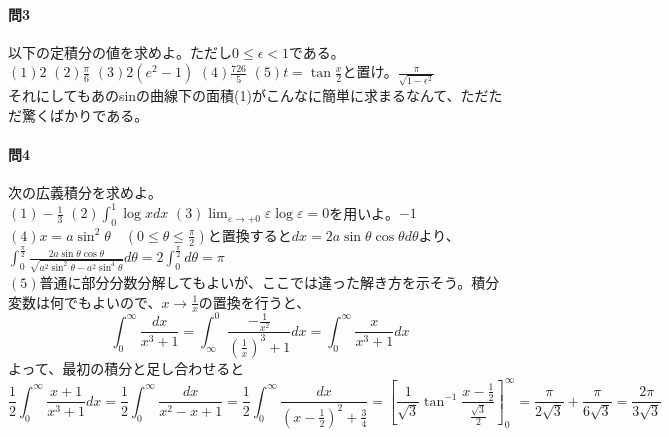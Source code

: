 \documentclass[a4j,dvipdfmx]{jsarticle}
\begin{document}
                    \paragraph{問3}以下の定積分の値を求めよ。ただし$0\leq \epsilon < 1$である。\\
                    $(1)\displaystyle 2$\hspace{3mm}
                    $(2)\displaystyle \frac{\pi}{6}$\hspace{3mm}
                    $(3)\displaystyle 2(e^2-1)$\hspace{3mm}
                    $(4)\displaystyle \frac{726}{5}$\hspace{3mm}
                    $(5)t=\tan\frac{x}{2}$と置け。$\displaystyle \frac{\pi}{\sqrt{1-\epsilon^2}}$\\
                    それにしてもあのsinの曲線下の面積(1)がこんなに簡単に求まるなんて、ただただ驚くばかりである。

                    \paragraph{問4}次の広義積分を求めよ。\\
                    $(1)\displaystyle -\frac{1}{3}$\hspace{3mm}
                    $(2)\displaystyle \int_0^1 \log xdx$\hspace{3mm}
                    $(3)\displaystyle \lim_{\varepsilon\to +0}\varepsilon\log \varepsilon = 0$を用いよ。$-1$\\
                    $(4)x=a\sin^2 \theta\quad(0\leq\theta\leq \frac{\pi}{2})$と置換すると$dx = 2a\sin\theta\cos\theta d\theta$より、\\$\displaystyle \int_0^{\frac{\pi}{2}} \frac{2a\sin\theta\cos\theta}{\sqrt{a^2\sin^2\theta-a^2\sin^4\theta}}d\theta=2\int_{0}^{\frac{\pi}{2}}d\theta =\pi$\\
                    $(5)$普通に部分分数分解してもよいが、ここでは違った解き方を示そう。積分変数は何でもよいので、$x\to \frac{1}{x}$の置換を行うと、
                    \begin{equation*}
                        \int_{0}^{\infty}\frac{dx}{x^3+1}=\int_{\infty}^{0}\frac{-\frac{1}{x^2}}{\left(\frac{1}{x}\right)^3+1}dx=\int_{0}^{\infty}\frac{x}{x^3+1}dx
                    \end{equation*}
                    よって、最初の積分と足し合わせると
                    \begin{equation*}
                        \frac{1}{2}\int_{0}^{\infty}\frac{x+1}{x^3+1}dx=\frac{1}{2}\int_{0}^{\infty}\frac{dx}{x^2-x+1}=\frac{1}{2}\int_{0}^{\infty}\frac{dx}{\left(x-\frac{1}{2}\right)^2+\frac{3}{4}}=\left[\frac{1}{\sqrt{3}}\tan^{-1}\frac{x-\frac{1}{2}}{\frac{\sqrt{3}}{2}}\right]_0^\infty=\frac{\pi}{2\sqrt{3}}+\frac{\pi}{6\sqrt{3}}=\frac{2\pi}{3\sqrt{3}}
                    \end{equation*}
\end{document}
